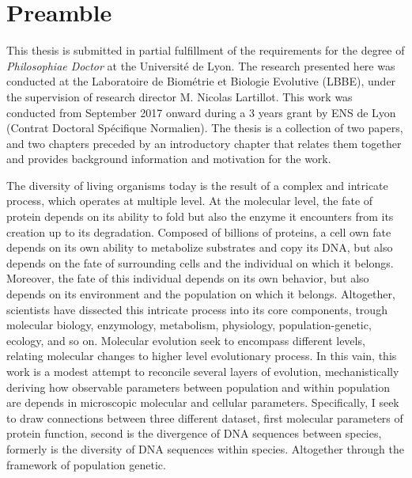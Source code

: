 \chapter*{Preamble}
This thesis is submitted in partial fulfillment of the requirements
for the degree of \emph{Philosophiae Doctor} at the Université de Lyon.
The research presented here was conducted at the Laboratoire de Biométrie et Biologie Evolutive (LBBE), under the supervision of research director M. Nicolas Lartillot.
This work was conducted from September 2017 onward during a 3 years grant by ENS de Lyon (Contrat Doctoral Spécifique Normalien).
The thesis is a collection of two papers, and two chapters preceded by an introductory chapter that relates them together and provides background information and motivation for the work.

The diversity of living organisms today is the result of a complex and intricate process, which operates at multiple level.
At the molecular level, the fate of protein depends on its ability to fold but also the enzyme it encounters from its creation up to its degradation. 
Composed of billions of proteins, a cell own fate depends on its own ability to metabolize substrates and copy its \acrshort{DNA}, but also depends on the fate of surrounding cells and the individual on which it belongs.
Moreover, the fate of this individual depends on its own behavior, but also depends on its environment and the population on which it belongs.
Altogether, scientists have dissected this intricate process into its core components, trough molecular biology, enzymology, metabolism, physiology, population-genetic, ecology, and so on. 
Molecular evolution seek to encompass different levels, relating molecular changes to higher level evolutionary process.
In this vain, this work is a modest attempt to reconcile several layers of evolution, mechanistically deriving how observable parameters between population and within population are depends in microscopic molecular and cellular parameters.
Specifically, I seek to draw connections between three different dataset, first molecular parameters of protein function, second is the divergence of \acrshort{DNA} sequences between species, formerly is the diversity of \acrshort{DNA} sequences within species.
Altogether through the framework of population genetic.